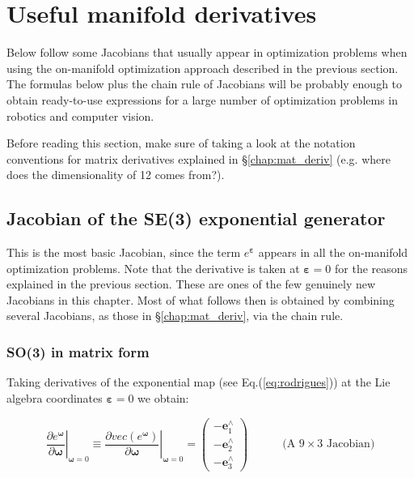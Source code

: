 \documentclass[a4paper,11pt]{report}
\newcommand{\E}{{\bm{\varepsilon}}}
\newcommand{\W}{{\bm{\omega}}}
\newcommand{\hatop}[1]{#1^\wedge}
\begin{document}
\section{Useful manifold derivatives}
\label{chap:se3_lie:deriv}

Below follow some Jacobians that usually appear in optimization problems
when using the on-manifold optimization approach described in the previous section.
The formulas below plus the chain rule of Jacobians will be probably enough
to obtain ready-to-use expressions for a large number of optimization problems
in robotics and computer vision.

Before reading this section, make sure of taking a look at the notation conventions
for matrix derivatives explained in \S\ref{chap:mat_deriv}
(e.g. where does the dimensionality of 12 comes from?).


\subsection{Jacobian of the SE(3) exponential generator}
\label{sect:jacob_se3_gen}

This is the most basic Jacobian, since the term $e^\E$ appears in all
the on-manifold optimization problems.
Note that the derivative is taken at $\E=0$ for the reasons explained
in the previous section.
These are ones of the few genuinely new Jacobians in this chapter.
Most of what follows then is obtained by combining several Jacobians,
as those in \S\ref{chap:mat_deriv}, via the chain rule.


\subsubsection{SO(3) in matrix form}

Taking derivatives of the exponential map (see Eq.(\ref{eq:rodrigues})) at the Lie algebra coordinates $\E=0$ we obtain:

\begin{equation}
\left. \frac{\partial e^\W}{\partial \W} \right|_{\W=0}
\equiv 
\left. \frac{\partial vec(e^\W)}{\partial \W} \right|_{\W=0}
=
\left(
\begin{array}{c}
 -\hatop{\mathbf{e}}_1 \\
-\hatop{\mathbf{e}}_2 \\
-\hatop{\mathbf{e}}_3
\end{array}
\right)
\quad\quad\quad \text{(A $9 \times 3$ Jacobian)}
\end{equation}
\end{document}
